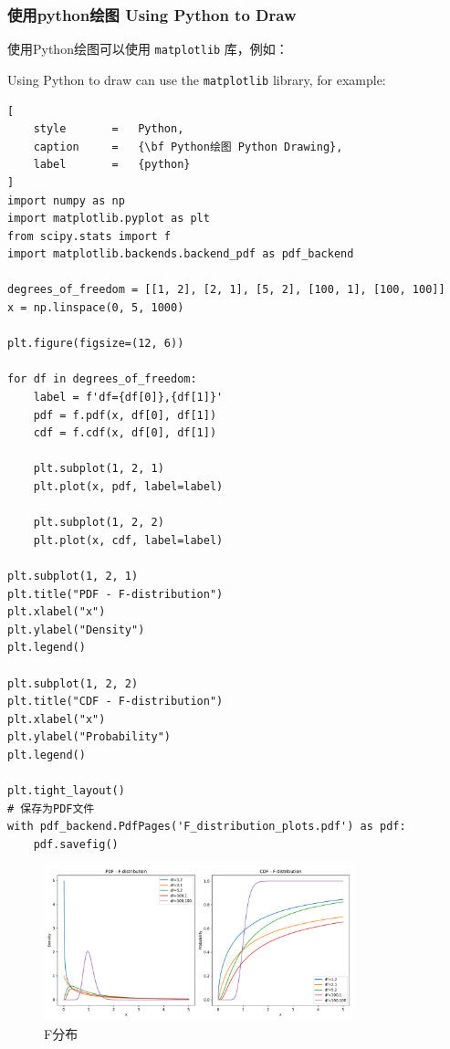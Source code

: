 \documentclass{article}
\begin{document}
\subsubsection{使用python绘图 Using Python to Draw}

使用Python绘图可以使用 \verb|matplotlib| 库，例如：

Using Python to draw can use the \verb|matplotlib| library, for example:

\begin{lstlisting}[
    style       =   Python,
    caption     =   {\bf Python绘图 Python Drawing},
    label       =   {python}
]
import numpy as np
import matplotlib.pyplot as plt
from scipy.stats import f
import matplotlib.backends.backend_pdf as pdf_backend

degrees_of_freedom = [[1, 2], [2, 1], [5, 2], [100, 1], [100, 100]]
x = np.linspace(0, 5, 1000)

plt.figure(figsize=(12, 6))

for df in degrees_of_freedom:
    label = f'df={df[0]},{df[1]}'
    pdf = f.pdf(x, df[0], df[1])
    cdf = f.cdf(x, df[0], df[1])

    plt.subplot(1, 2, 1)
    plt.plot(x, pdf, label=label)

    plt.subplot(1, 2, 2)
    plt.plot(x, cdf, label=label)

plt.subplot(1, 2, 1)
plt.title("PDF - F-distribution")
plt.xlabel("x")
plt.ylabel("Density")
plt.legend()

plt.subplot(1, 2, 2)
plt.title("CDF - F-distribution")
plt.xlabel("x")
plt.ylabel("Probability")
plt.legend()

plt.tight_layout()
# 保存为PDF文件
with pdf_backend.PdfPages('F_distribution_plots.pdf') as pdf:
    pdf.savefig()
\end{lstlisting}

\begin{figure}[htbp]
    \begin{center}
        \includegraphics[width=0.8\textwidth]{imgs/F_distribution_plots.pdf}
        \caption{F分布}
        \label{fig:F}
    \end{center}
\end{figure}
\end{document}
